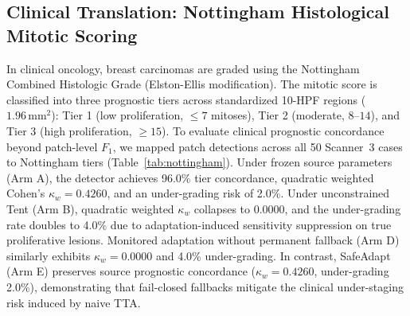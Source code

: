 \documentclass[conference]{IEEEtran}
\begin{document}
\subsection{Clinical Translation: Nottingham Histological Mitotic Scoring}
In clinical oncology, breast carcinomas are graded using the Nottingham Combined Histologic Grade (Elston-Ellis modification).
The mitotic score is classified into three prognostic tiers across standardized 10-HPF regions ($1.96\,\mathrm{mm}^2$): Tier 1 (low proliferation, $\le 7$ mitoses), Tier 2 (moderate, $8$--$14$), and Tier 3 (high proliferation, $\ge 15$).
To evaluate clinical prognostic concordance beyond patch-level $F_1$, we mapped patch detections across all 50 Scanner~3 cases to Nottingham tiers (Table~\ref{tab:nottingham}).
Under frozen source parameters (Arm A), the detector achieves 96.0\% tier concordance, quadratic weighted Cohen's $\kappa_w = 0.4260$, and an under-grading risk of 2.0\%.
Under unconstrained Tent (Arm B), quadratic weighted $\kappa_w$ collapses to $0.0000$, and the under-grading rate doubles to 4.0\% due to adaptation-induced sensitivity suppression on true proliferative lesions.
Monitored adaptation without permanent fallback (Arm D) similarly exhibits $\kappa_w = 0.0000$ and 4.0\% under-grading.
In contrast, SafeAdapt (Arm E) preserves source prognostic concordance ($\kappa_w = 0.4260$, under-grading 2.0\%), demonstrating that fail-closed fallbacks mitigate the clinical under-staging risk induced by naive TTA.

\begin{table}[t]
\centering
\caption{Clinical Nottingham Histological Mitotic Grade Concordance Across 50 Cases on Scanner 3 (Mean over 3 Seeds).}
\label{tab:nottingham}
\scriptsize
\setlength{\tabcolsep}{3.5pt}
\end{table}
\end{document}
